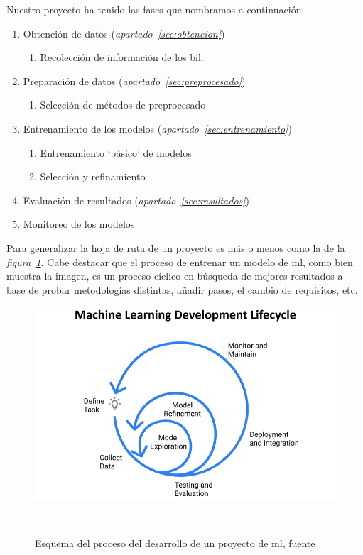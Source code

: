 Nuestro proyecto ha tenido las fases que nombramos a continuación:

\begin{enumerate}
    \item Obtención de datos (\textit{apartado\ \ref{sec:obtencion}})
        \begin{enumerate}
            \item Recolección de información de los \acrshort{bil}.
        \end{enumerate}
    \item Preparación de datos (\textit{apartado\ \ref{sec:preprocesado}})
        \begin{enumerate}
            \item Selección de métodos de preprocesado
        \end{enumerate}
    \item Entrenamiento de los modelos (\textit{apartado\ \ref{sec:entrenamiento}})
        \begin{enumerate}
            \item Entrenamiento `básico' de modelos
            \item Selección y refinamiento
        \end{enumerate}
    \item Evaluación de resultados (\textit{apartado\ \ref{sec:resultados}})
        
    \item Monitoreo de los modelos
\end{enumerate}

Para generalizar la hoja de ruta de un proyecto es más o menos como la de la \textit{figura\ \ref{fig:ml-development-cycle}}. Cabe destacar que el proceso de entrenar un modelo de \gls{ml}, como bien muestra la imagen, es un proceso cíclico en búsqueda de mejores resultados a base de probar metodologías distintas, añadir pasos, el cambio de requisitos, etc.

\begin{figure}[!htb]
    \centering
    \includegraphics[width=\linewidth]{media/images/ml-development-cycle.png}
    \caption{Esquema del proceso del desarrollo de un proyecto de \gls{ml}, fuente\ \cite{Organizi22:online}}\ \label{fig:ml-development-cycle}
\end{figure}


